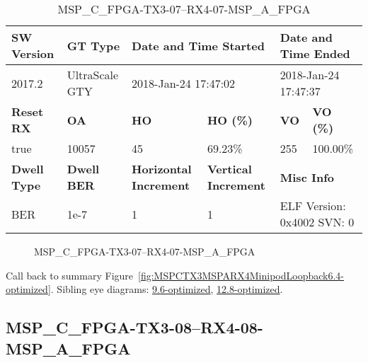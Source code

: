 \begin{table}[h]
\centering
\caption{MSP\_C\_FPGA-TX3-07--RX4-07-MSP\_A\_FPGA}
\label{tab:MSPCFPGATX307RX407MSPAFPGA6.4-optimized}
\begin{tabular}{@{}|l|l|l|l|l|l|@{}}
\toprule
\textbf{SW Version}                & \textbf{GT Type}   & \multicolumn{2}{l|}{\textbf{Date and Time Started}}            & \multicolumn{2}{l|}{\textbf{Date and Time Ended}}        \\ \midrule
2017.2                       & UltraScale GTY          & \multicolumn{2}{l|}{2018-Jan-24 17:47:02}                   & \multicolumn{2}{l|}{2018-Jan-24 17:47:37}               \\ \midrule
\textbf{Reset RX}                  & \textbf{OA} & \textbf{HO}   & \textbf{HO (\%)} & \textbf{VO} & \textbf{VO (\%)} \\ \midrule
true & 10057        & 45          & 69.23\%        & 255        & 100.00\%       \\ \midrule
\textbf{Dwell Type}                & \textbf{Dwell BER} & \textbf{Horizontal Increment} & \textbf{Vertical Increment}    & \multicolumn{2}{l|}{\textbf{Misc Info}}                  \\ \midrule
BER                            & 1e-7        & 1        & 1           & \multicolumn{2}{l|}{ELF Version: 0x4002 SVN: 0}                         \\ \bottomrule
\end{tabular}
\end{table}

\begin{figure}[h]
\caption{MSP\_C\_FPGA-TX3-07--RX4-07-MSP\_A\_FPGA} \label{fig:MSPCFPGATX307RX407MSPAFPGA6.4-optimized}
\end{figure}

Call back to summary Figure~\ref{fig:MSPCTX3MSPARX4MinipodLoopback6.4-optimized}.
Sibling eye diagrams: \hyperref[sec:MSPCFPGATX307RX407MSPAFPGA9.6-optimized]{9.6-optimized}, \hyperref[sec:MSPCFPGATX307RX407MSPAFPGA12.8-optimized]{12.8-optimized}.

\clearpage
\newpage


\subsection{MSP\_C\_FPGA-TX3-08--RX4-08-MSP\_A\_FPGA}\label{sec:MSPCFPGATX308RX408MSPAFPGA6.4-optimized}

